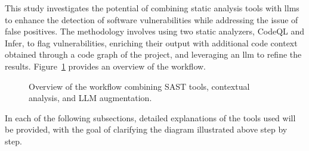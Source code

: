 This study investigates the potential of combining static analysis tools with \aclp{llm} to enhance the detection of software vulnerabilities while addressing the issue of false positives. 
The methodology involves using two static analyzers, CodeQL and Infer, to flag vulnerabilities, enriching their output with additional code context obtained through a code graph of the project, and leveraging an \ac{llm} to refine the results. 
Figure~\ref{workflow} provides an overview of the workflow.

\begin{figure}[H]
    \centering
    \caption{Overview of the workflow combining SAST tools, contextual analysis, and LLM augmentation.}
    \label{workflow}
\end{figure}


In each of the following subsections, detailed explanations of the tools used will be provided, with the goal of clarifying the diagram illustrated above step by step.